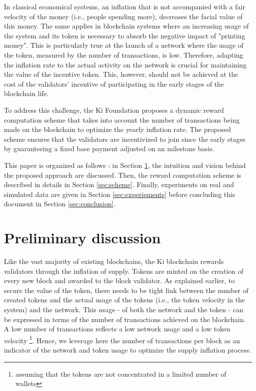 \documentclass[conference]{IEEEtran}
\begin{document}
In classical economical systems, an inflation that is not accompanied with a fair velocity of the money (i.e., people spending more), decreases the facial value of this money. The same applies in blockchain systems where an increasing usage of the system and its token is necessary to absorb the negative impact of "printing money". This is particularly true at the launch of a network where the usage of the token, measured by the number of transactions, is low. Therefore, adapting the inflation rate to the actual activity on the network is crucial for maintaining the value of the incentive token. This, however, should not be  achieved at the cost of the validators' incentive of participating in the early stages of the blockchain life.

To address this challenge, the Ki Foundation proposes a dynamic reward computation scheme that takes into account the number of transactions being made on the blockchain to optimize the yearly inflation rate. The proposed scheme ensures that the validators are incentivized to join since the early stages by guaranteeing a fixed base payment adjusted on an milestone basis.

This paper is organized as follows :  in Section \ref{sec:discussion}, the intuition and vision behind the proposed approach are discussed. Then, the reward computation scheme is described in details in Section \ref{sec:scheme}. Finally, experiments on real and simulated data are given in Section \ref{sec:experiements} before concluding this document in Section \ref{sec:conclusion}.

\section{Preliminary discussion}
\label{sec:discussion}
Like the vast majority of existing blockchains, the Ki blockchain rewards validators through the inflation of supply. Tokens are minted on the creation of every new block and awarded to the block validator. As explained earlier, to secure the value of the token, there needs to be tight link between the number of created tokens and the actual usage of the tokens (i.e., the token velocity in the system) and the network. This usage - of both the network and the token - can be expressed in terms of the number of transactions achieved on the blockchain. A low number of transactions reflects a low network usage and a low token velocity \footnote{assuming that the tokens are not concentrated in a limited number of wallets}. Hence, we leverage here the number of transactions per block as an indicator of the network and token usage to optimize the  supply inflation process.
\end{document}

